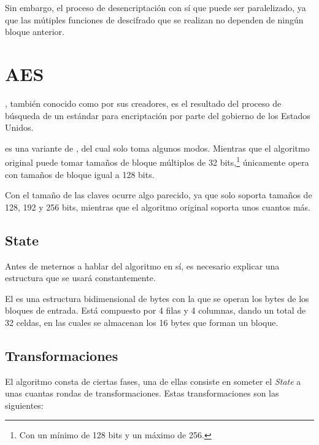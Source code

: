  Sin embargo, el proceso de desencriptación con  sí que puede ser paralelizado,
 ya que las mútiples funciones de descifrado que se realizan no dependen de ningún bloque anterior. \emph{\parencite{Reference24}}


 \section{AES}

 , también conocido como  por sus creadores,
 es el resultado del proceso de búsqueda de un estándar para encriptación por parte del gobierno de los Estados Unidos.

  es una variante de , del cual solo toma algunos modos.
 Mientras que el algoritmo original puede tomar tamaños de bloque múltiplos de 32 bits,\footnote{Con un mínimo de 128 bits y un máximo de 256.}
  únicamente opera con tamaños de bloque igual a 128 bits.

 Con el tamaño de las claves ocurre algo parecido, ya que  solo soporta tamaños de 128, 192 y 256 bits,
 mientras que el algoritmo original soporta unos cuantos más. \emph{\parencite{Reference25}}

 \subsection{State}

 Antes de meternos a hablar del algoritmo en sí, es necesario explicar una estructura que se usará
 constantemente.

 El  es una estructura bidimensional de bytes con la que se operan los bytes
 de los bloques de entrada. Está compuesto por 4 filas y 4 columnas, dando un total de 32 celdas,
 en las cuales se almacenan los 16 bytes que forman un bloque. \emph{\parencite{Reference26}}

 \subsection{Transformaciones}

 El algoritmo consta de ciertas fases, una de ellas consiste en someter el \emph{State}
 a unas cuantas rondas de transformaciones. Estas transformaciones son las siguientes:

